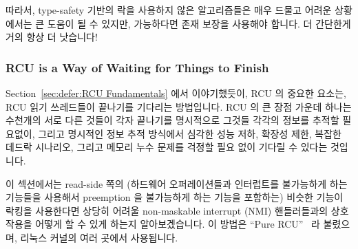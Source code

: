 따라서, type-safety 기반의 락을 사용하지 않은 알고리즘들은 매우 드물고 어려운
상황에서는 큰 도움이 될 수 있지만, 가능하다면 존재 보장을 사용해야 합니다.
더 간단한게 거의 항상 더 낫습니다!

\subsubsection{RCU is a Way of Waiting for Things to Finish}
\label{sec:defer:RCU is a Way of Waiting for Things to Finish}

Section~\ref{sec:defer:RCU Fundamentals} 에서 이야기했듯이, RCU 의 중요한
요소는, RCU 읽기 쓰레드들이 끝나기를 기다리는 방법입니다.
RCU 의 큰 장점 가운데 하나는 수천개의 서로 다른 것들이 각자 끝나기를 명시적으로
그것들 각각의 정보를 추적할 필요없이, 그리고 명시적인 정보 추적 방식에서 심각한
성능 저하, 확장성 제한, 복잡한 데드락 시나리오, 그리고 메모리 누수 문제를
걱정할 필요 없이 기다릴 수 있다는 것입니다.

이 섹션에서는 read-side 쪽의 (하드웨어 오퍼레이션들과 인터럽트를 불가능하게
하는 기능들을 사용해서 preemption 을 불가능하게 하는 기능을 포함하는)
 비슷한 기능이 락킹을 사용한다면 상당히 어려울
non-maskable interrupt (NMI) 핸들러들과의 상호작용을 어떻게 할 수 있게 하는지
알아보겠습니다.
이 방법은 ``Pure RCU''~\cite{PaulEdwardMcKenneyPhD} 라 불렸으며, 리눅스 커널의
여러 곳에서 사용됩니다.

